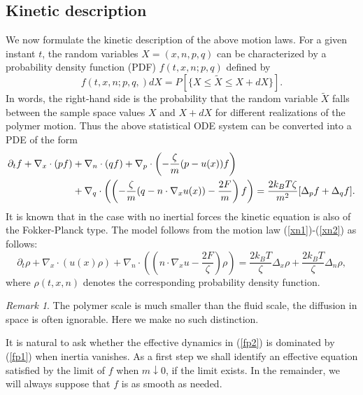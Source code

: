 \documentclass[reqno]{amsart}
\numberwithin{equation}{section}
\theoremstyle{definition}
\theoremstyle{remark}
\newtheorem{Remark}{Remark}[section]
\begin{document}
\subsection{Kinetic description}
We now formulate the kinetic description of the above motion laws.
For a given instant $t$, the random variables $X=(x, n, p, q)$ 
can be characterized by a probability density function (PDF) $f(t, x, n; p, q)$ defined by
$$
f(t, x, n;p, q,)dX=P[\{X\leq \tilde X\leq X+dX\}].
$$
In words, the right-hand side is the probability that the random variable 
$\tilde X$ falls between the sample space values 
$X$ and $X+dX$ for different realizations of the polymer motion. Thus the above statistical ODE system can be converted into a PDE of the form
\begin{align}\label{fp2}
\partial_t f +\nabla_x\cdot (pf) &+\nabla_n\cdot(qf)
+\nabla_p\cdot\left(-\frac{\zeta}{m}(p-u(x))f \right)\\ \notag
&+\nabla_q\cdot\left(\left(-\frac{\zeta}{m}(q-n\cdot \nabla_x u(x))
-\frac{2F}{m}\right)f\right)=\frac{2k_BT\zeta}{m^2}[\Delta_p f
+\Delta_q f].
\end{align}
It is known that in the case with no inertial forces the kinetic
equation is also of the Fokker-Planck type. The model follows from
the motion law (\ref{xn1})-(\ref{xn2}) as follows:
\begin{equation}\label{fp1}
    \partial_t \rho + \nabla_x\cdot(u(x)\rho) +\nabla_n \cdot \left(\left(n\cdot \nabla_x u-\frac{2F}{\zeta}\right)\rho\right)=
\frac{2k_BT}{\zeta}\Delta_x \rho +\frac{2k_BT}{\zeta}\Delta_n \rho,
\end{equation}
where $\rho(t, x, n)$ denotes the corresponding probability density
function.

\begin{Remark}
The polymer scale is much smaller than the fluid scale, the
diffusion in space is often ignorable. Here we make no such
distinction.
\end{Remark}

It is natural to ask whether the effective dynamics in (\ref{fp2}) is dominated by (\ref{fp1}) when inertia vanishes. As a first step we shall identify an effective equation satisfied
by the limit of $f$ when $m \downarrow 0$, if the limit exists. In the remainder, we will always suppose that $f$ is as smooth as needed.
\end{document}
